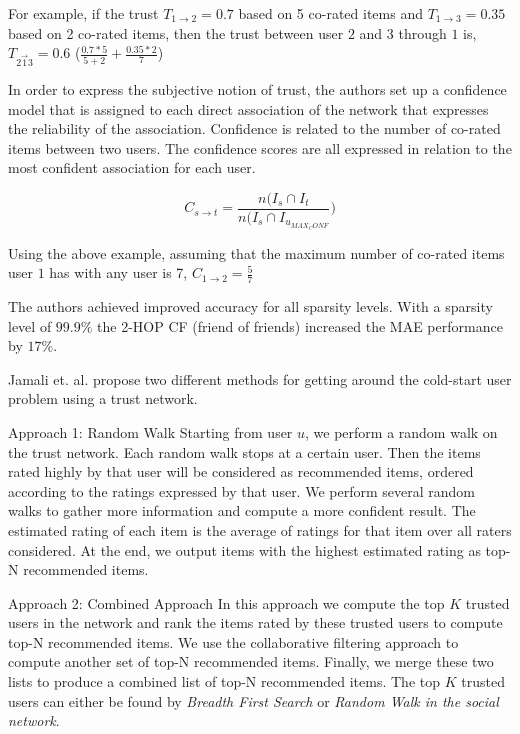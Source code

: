For example, if the trust $T_{1 \rightarrow 2} = 0.7$ based on 5 co-rated items
and $T_{1 \rightarrow 3} = 0.35$ based on 2 co-rated items, then the trust
between user $2$ and $3$ through $1$ is, $T_{2 \overrightarrow{1} 3} = 0.6$
($\frac{0.7*5}{5+2} + \frac{0.35*2}{7}$)

In order to express the subjective notion of trust, the authors set up a
confidence model that is assigned to each direct association of the network
that expresses the reliability of the association. Confidence is related to the
number of co-rated items between two users. The confidence scores are all
expressed in relation to the most confident association for each user.

\begin{equation}
C_{s \rightarrow t} = \frac{n(I_{s} \cap I_{t}}{n(I_{s} \cap I_{u_{MAX_CONF}}})
\end{equation}

Using the above example, assuming that the maximum number of co-rated items
user $1$ has with any user is 7, $C_{1 \rightarrow 2} = \frac{5}{7}$

The authors achieved improved accuracy for all sparsity levels. With a sparsity
level of $99.9\%$ the 2-HOP CF (friend of friends) increased the MAE
performance by $17\%$.


Jamali et. al. \cite{Jamali2009} propose two different methods for getting
around the cold-start user problem using a trust network.

Approach 1: Random Walk
Starting from user $u$, we perform a random walk on the trust network. Each
random walk stops at a certain user. Then the items rated highly by that user
will be considered as recommended items, ordered according to the ratings
expressed by that user. We perform several random walks to gather more
information and compute a more confident result. The estimated rating of each
item is the average of ratings for that item over all raters considered. At the
end, we output items with the highest estimated rating as top-N recommended
items.%

Approach 2: Combined Approach
In this approach we compute the top $K$ trusted users in the network and rank
the items rated by these trusted users to compute top-N recommended items. We
use the collaborative filtering approach to compute another set of top-N
recommended items. Finally, we merge these two lists to produce a combined list
of top-N recommended items. The top $K$ trusted users can either be found by
\emph{Breadth First Search} or \emph{Random Walk in the social network}.%

